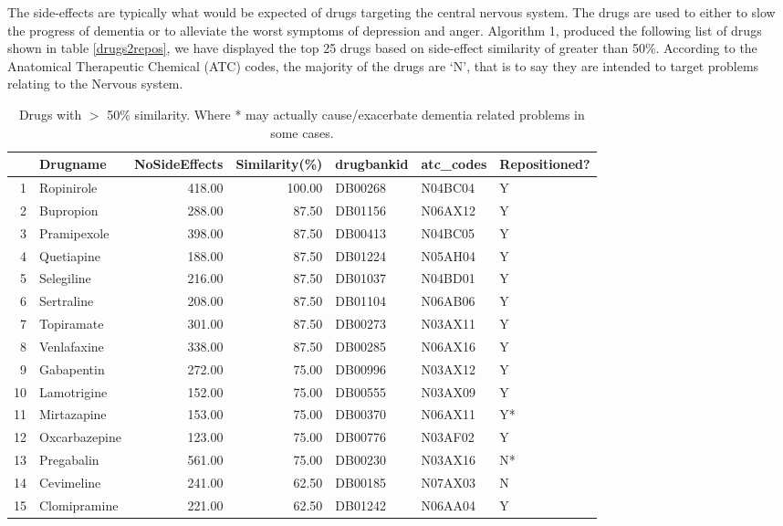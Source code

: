 \documentclass[preprint,12pt]{elsarticle}
\begin{document}
The side-effects are typically what would be expected of drugs targeting the central nervous system. The drugs are used to either to slow the progress of dementia or to alleviate the worst symptoms of depression and anger. Algorithm 1, produced the following list of drugs shown in table \ref{drugs2repos}, we have displayed the top 25 drugs based on side-effect similarity of greater than 50\%. According to the Anatomical Therapeutic Chemical (ATC) codes, the majority of the drugs are `N', that is to say they are intended to target problems relating to the Nervous system. 

\begin{table}[h]
\centering \scriptsize  \caption{Drugs with $>$ 50\% similarity. Where * may actually cause/exacerbate dementia related problems in some cases.}
\begin{tabular}{rlrrlll}
  \hline
 & Drugname & NoSideEffects & Similarity(\%) & drugbankid & atc\_codes&Repositioned? \\ 
  \hline
1 & Ropinirole & 418.00 & 100.00 & DB00268 & N04BC04 & Y\\ 
  2 & Bupropion & 288.00 & 87.50 & DB01156 & N06AX12 & Y\\ 
  3 & Pramipexole & 398.00 & 87.50 & DB00413 & N04BC05 & Y\\ 
  4 & Quetiapine & 188.00 & 87.50 & DB01224 & N05AH04 & Y\\ 
  5 & Selegiline & 216.00 & 87.50 & DB01037 & N04BD01 &Y\\ 
  6 & Sertraline & 208.00 & 87.50 & DB01104 & N06AB06 &Y\\ 
  7 & Topiramate & 301.00 & 87.50 & DB00273 & N03AX11&Y \\ 
  8 & Venlafaxine & 338.00 & 87.50 & DB00285 & N06AX16&Y \\ 
  9 & Gabapentin & 272.00 & 75.00 & DB00996 & N03AX12&Y \\ 
  10 & Lamotrigine & 152.00 & 75.00 & DB00555 & N03AX09&Y \\ 
  11 & Mirtazapine & 153.00 & 75.00 & DB00370 & N06AX11&Y* \\ 
  12 & Oxcarbazepine & 123.00 & 75.00 & DB00776 & N03AF02 &Y\\ 
  13 & Pregabalin & 561.00 & 75.00 & DB00230 & N03AX16 &N*\\ 
  14 & Cevimeline & 241.00 & 62.50 & DB00185 & N07AX03&N \\ 
  15 & Clomipramine & 221.00 & 62.50 & DB01242 & N06AA04&Y \\ 

\end{tabular}
\end{table}
\end{document}
